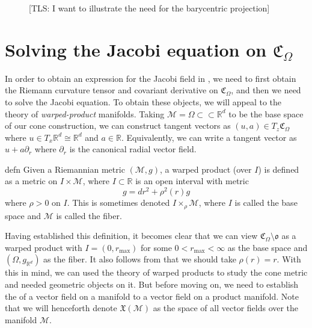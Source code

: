 \documentclass{article}
\newcommand{\man}{\mathcal{M}}
\newcommand{\tls}[1]{{\color{cyan}[TLS: #1]}}
\begin{document}
\begin{figure}[t]
\caption{\tls{I want to illustrate the need for the barycentric projection}}
\end{figure}




\section{Solving the Jacobi equation on  $\mathfrak{C}_\Omega$}

In order to obtain an expression for the Jacobi field in , we need to first obtain the Riemann curvature tensor and covariant derivative on $\mathfrak{C}_\Omega$, and then we need to solve the Jacobi equation. To obtain these objects, we will appeal to the theory of \textit{warped-product} manifolds.
Taking $\man = \Omega \subset \subset \mathbb{R}^d$ to be the base space of our cone construction, we can construct tangent vectors as $(u, a) \in T_{z}\mathfrak{C}_\Omega$ where $u \in T_x\mathbb{R}^d \cong \mathbb{R}^d$ and $a \in \mathbb{R}$. Equivalently, we can write a tangent vector as $u + a\partial_r$ where $\partial_r$ is the canonical radial vector field. 
 
\begin{restatable}{defn}{}
    Given a Riemannian metric $(\man, g)$, a warped product (over $I$) is defined as a metric on $I \times \man$, where $I \subset \mathbb{R}$ is an open interval with metric 
    \[g = dr^2 + \rho^2(r)g\]
    where $\rho > 0$ on $I$. This is sometimes denoted $I \times_{\rho} \man$, where $I$ is called the base space and $\man$ is called the fiber.
\end{restatable}
Having established this definition, it becomes clear that we can view $\mathfrak{C}_\Omega \setminus \mathfrak{o}$ as a warped product with $I = (0, r_{\max})$ for some $0 < r_{\max} <\infty $ as the base space and $(\Omega, g_{\mathbb{R}^d})$ as the fiber. It also follows from  that we should take $\rho(r) = r$. With this in mind, we can used the theory of warped products to study the cone metric and needed geometric objects on it. But before moving on, we need to establish the  of a vector field on a manifold to a vector field on a product manifold. Note that we will henceforth denote $\mathfrak{X}(\man)$ as the space of all vector fields over the manifold $\man$. 
\end{document}
